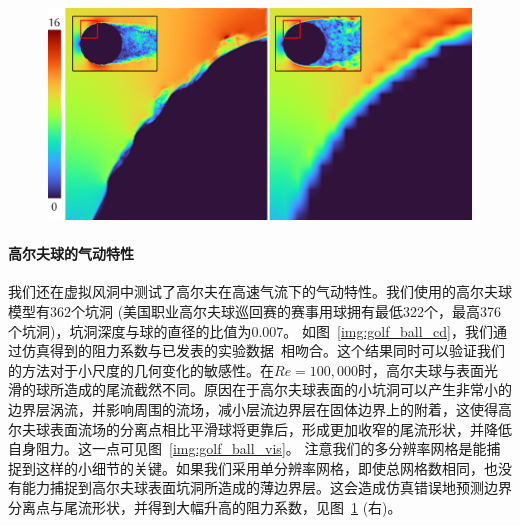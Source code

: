 \begin{figure}[htb]
  \centering
    \includegraphics[width=0.99\columnwidth]{figures/golf_ball_single_res.png}
  \label{img:golf_ball_comp_single_res}
\end{figure}
  
\paragraph{高尔夫球的气动特性}
我们还在虚拟风洞中测试了高尔夫在高速气流下的气动特性。我们使用的高尔夫球模型有$362$个坑洞 (美国职业高尔夫球巡回赛的赛事用球拥有最低322个，最高376个坑洞)，坑洞深度与球的直径的比值为$0.007$。
如图~\ref{img:golf_ball_cd}，我们通过仿真得到的阻力系数与已发表的实验数据~\cite{Bearman-1976, Aoki-2010}相吻合。这个结果同时可以验证我们的方法对于小尺度的几何变化的敏感性。在$Re\!=\!100,000$时，高尔夫球与表面光滑的球所造成的尾流截然不同。原因在于高尔夫球表面的小坑洞可以产生非常小的边界层涡流，并影响周围的流场，减小层流边界层在固体边界上的附着，这使得高尔夫球表面流场的分离点相比平滑球将更靠后，形成更加收窄的尾流形状，并降低自身阻力。这一点可见图~\ref{img:golf_ball_vis}。
注意我们的多分辨率网格是能捕捉到这样的小细节的关键。如果我们采用单分辨率网格，即使总网格数相同，也没有能力捕捉到高尔夫球表面坑洞所造成的薄边界层。这会造成仿真错误地预测边界分离点与尾流形状，并得到大幅升高的阻力系数，见图~\ref{img:golf_ball_comp_single_res} (右)。


